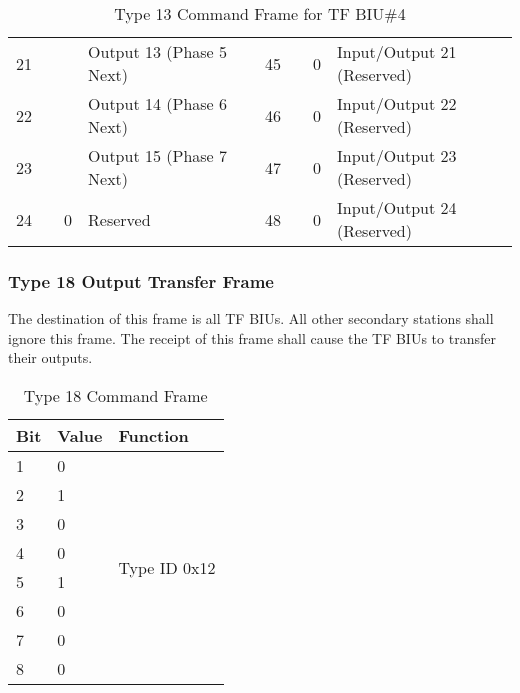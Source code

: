 \documentclass[]{article}
\begin{document}
\begin{landscape}
\begin{table}[]
\begin{tabular}{lllllllll}
			21           &                    &                   & Output 13 (Phase 5 Next)      &                   & 45           &                    & 0                 & Input/Output 21 (Reserved)            \\
			22           &                    &                   & Output 14 (Phase 6 Next)      &                   & 46           &                    & 0                 & Input/Output 22 (Reserved)            \\
			23           &                    &                   & Output 15 (Phase 7 Next)      &                   & 47           &                    & 0                 & Input/Output 23 (Reserved)            \\ \cline{3-4}
			24           &                    & 0                 & Reserved                      &                   & 48           &                    & 0                 & Input/Output 24 (Reserved)            \\ \cline{1-4} \cline{6-9} 
		\end{tabular}
		\caption{Type 13 Command Frame for TF BIU\#4}
		\label{tab:type-13-frame}
	\end{table}
\end{landscape}

\clearpage
\subsubsection {Type 18 Output Transfer Frame}
The destination of this frame is all TF BIUs. All other secondary stations shall ignore this frame. The receipt of this frame shall cause the TF BIUs to transfer their outputs.

\begin{table}[ht]
	\centering
	\begin{tabular}{lll}
		\hline
		\textbf{Bit} & \textbf{Value} & \textbf{Function}             \\ \hline
		1            & 0              & \multirow{8}{*}{Type ID 0x12} \\
		2            & 1              &                               \\
		3            & 0              &                               \\
		4            & 0              &                               \\
		5            & 1              &                               \\
		6            & 0              &                               \\
		7            & 0              &                               \\
		8            & 0              &                               \\ \hline
	\end{tabular}
	\caption{Type 18 Command Frame}
	\label{tab:type-18-frame}
\end{table}
\end{document}
